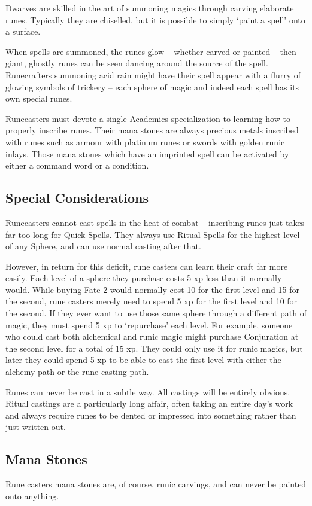 \begin{multicols}{2}


\noindent Dwarves are skilled in the art of summoning magics through carving elaborate runes. Typically they are chiselled, but it is possible to simply `paint a spell' onto a surface.

When spells are summoned, the runes glow -- whether carved or painted -- then giant, ghostly runes can be seen dancing around the source of the spell.
Runecrafters summoning acid rain might have their spell appear with a flurry of glowing symbols of trickery -- each sphere of magic and indeed each spell has its own special runes.

Runecasters must devote a single Academics specialization to learning how to properly inscribe runes.
Their mana stones are always precious metals inscribed with runes such as armour with platinum runes or swords with golden runic inlays.
Those mana stones which have an imprinted spell can be activated by either a command word or a condition.

\subsection{Special Considerations}

Runecasters cannot cast spells in the heat of combat -- inscribing runes just takes far too long for Quick Spells. They always use Ritual Spells for the highest level of any Sphere, and can use normal casting after that.

However, in return for this deficit, rune casters can learn their craft far more easily.
Each level of a sphere they purchase costs 5 \gls{xp} less than it normally would.
While buying Fate 2 would normally cost 10 for the first level and 15 for the second, rune casters merely need to spend 5 \gls{xp} for the first level and 10 for the second.
If they ever want to use those same sphere through a different path of magic, they must spend 5 \gls{xp} to `repurchase' each level.
For example, someone who could cast both alchemical and runic magic might purchase Conjuration at the second level for a total of 15 \gls{xp}.
They could only use it for runic magics, but later they could spend 5 \gls{xp} to be able to cast the first level with either the alchemy path or the rune casting path.

Runes can never be cast in a subtle way. All castings will be entirely obvious. Ritual castings are a particularly long affair, often taking an entire day's work and always require runes to be dented or impressed into something rather than just written out.

\subsection{Mana Stones}

Rune casters mana stones are, of course, runic carvings, and can never be painted onto anything.

\end{multicols}

